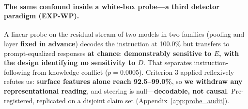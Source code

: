 \paragraph{The same confound inside a white-box probe---a third detector paradigm (EXP-WP).} A linear probe on the residual stream of two models in two families (pooling and layer \textbf{fixed in advance}) decodes the instruction at 100.0\% but transfers to prompt-equalized responses \textbf{at chance}: \textbf{demonstrably sensitive to $E$, with the design identifying no sensitivity to $D$}. That separates instruction-following from knowledge conflict ($p\!=\!0.0005$). Criterion 3 applied reflexively refutes us: \textbf{surface features alone reach 92.5--99.0\%}, so \textbf{we withdraw any representational reading}, and steering is null---\textbf{decodable, not causal}. Pre-registered, replicated on a disjoint claim set (Appendix~\ref{app:probe_audit}).


